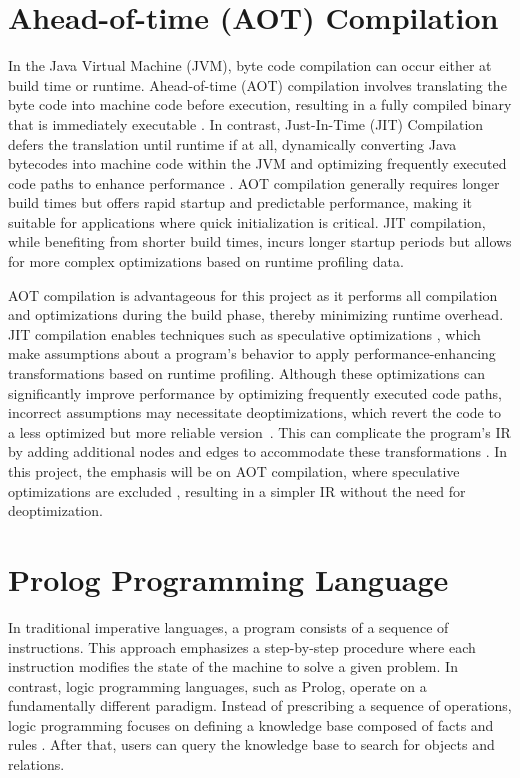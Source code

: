 \section{Ahead-of-time (AOT) Compilation}
In the Java Virtual Machine (JVM), byte code compilation can occur either at build time or runtime. Ahead-of-time (AOT) compilation involves translating the byte code into machine code before execution, resulting in a fully compiled binary that is immediately executable \cite{Wade2017}. In contrast, Just-In-Time (JIT) Compilation defers the translation until runtime if at all, dynamically converting Java bytecodes into machine code within the JVM and optimizing frequently executed code paths to enhance performance \cite{Wade2017}. AOT compilation generally requires longer build times but offers rapid startup and predictable performance, making it suitable for applications where quick initialization is critical. JIT compilation, while benefiting from shorter build times, incurs longer startup periods but allows for more complex optimizations based on runtime profiling data.

AOT compilation is advantageous for this project as it performs all compilation and optimizations during the build phase, thereby minimizing runtime overhead. JIT compilation enables techniques such as speculative optimizations \cite{Duboscq2013Inproceedings}, which make assumptions about a program’s behavior to apply performance-enhancing transformations based on runtime profiling. Although these optimizations can significantly improve performance by optimizing frequently executed code paths, incorrect assumptions may necessitate deoptimizations, which revert the code to a less optimized but more reliable version~\cite{Duboscq2013Inproceedings}. This can complicate the program's IR by adding additional nodes and edges to accommodate these transformations \cite{Duboscq2013Inproceedings}. In this project, the emphasis will be on AOT compilation, where speculative optimizations are excluded \cite{Wimmer2019}, resulting in a simpler IR without the need for deoptimization. 

\section{Prolog Programming Language}

In traditional imperative languages, a program consists of a sequence of instructions. This approach emphasizes a step-by-step procedure where each instruction modifies the state of the machine to solve a given problem. In contrast, logic programming languages, such as Prolog, operate on a fundamentally different paradigm. Instead of prescribing a sequence of operations, logic programming focuses on defining a knowledge base composed of facts and rules \cite{Bramer2013}. After that, users can query the knowledge base to search for objects and relations. 

